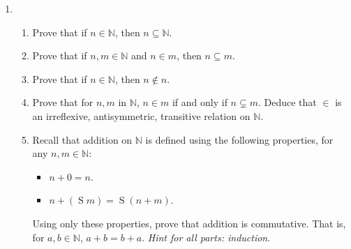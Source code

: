 \documentclass{amsart}
\theoremstyle{definition}
\newcommand{\Ss}{\operatorname{S}}
\newcommand{\Nn}{\mathbb{N}}
\begin{document}
\begin{enumerate}
\begin{enumerate}
\end{enumerate}
\item \begin{enumerate}
\item Prove that if $n \in \Nn$, then $n \subseteq \Nn$.
\item Prove that if $n, m \in \Nn$ and $n \in m$, then $n \subseteq m$.
\item Prove that if $n \in \Nn$, then $n \notin n$.
\item Prove that for $n, m$ in $\Nn$, $n \in m$ if and only if $n \subsetneq m$. Deduce that $\in$ is an irreflexive, antisymmetric, transitive relation on $\Nn$.
\item Recall that addition on $\Nn$ is defined using the following properties, for any $n, m \in \Nn$:

  \begin{itemize}
  \item $n + 0 = n$.
  \item $n + (\Ss m) = \Ss (n + m)$.
  \end{itemize}

  Using only these properties, prove that addition is commutative. That is, for $a, b \in \Nn$, $a + b = b + a$. 
  \emph{Hint for all parts: induction}.
\end{enumerate}
  

\end{enumerate}
\end{document}
